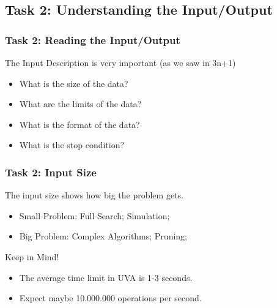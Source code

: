 \documentclass{beamer}
\begin{document}
\subsection{Task 2: Understanding the Input/Output}

\begin{frame}
  \frametitle{Task 2: Reading the Input/Output}

  The Input Description is \alert{very important} (as we saw in 3n+1)

  \bigskip

  {\small
  \begin{itemize}
  \item What is the size of the data?
  \item What are the limits of the data?
  \item What is the format of the data?
  \item What is the stop condition?
  \end{itemize}
  }
\end{frame}

\begin{frame}
  \frametitle{Task 2: Input Size}

  The input size shows how big the problem gets.

  \begin{itemize}
  \item Small Problem: Full Search; Simulation;
  \item Big Problem: Complex Algorithms; Pruning;
  \end{itemize}

  \begin{block}{Keep in Mind!}
    \begin{itemize}
    \item The average time limit in UVA is 1-3 seconds.
    \item Expect maybe 10.000.000 operations per second.
    \end{itemize}
  \end{block}
\end{frame}
\end{document}
